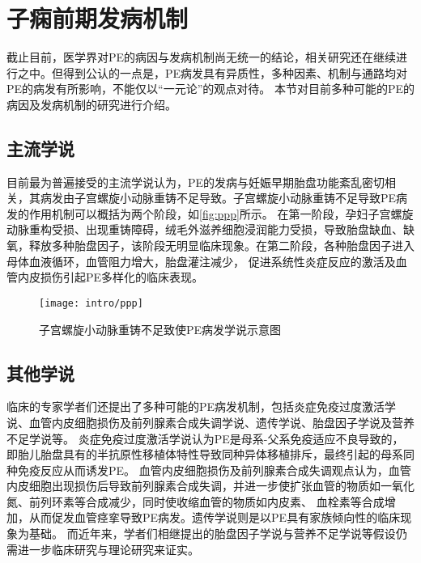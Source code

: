 \section{子痫前期发病机制}
截止目前，医学界对PE的病因与发病机制尚无统一的结论，相关研究还在继续进行之中。但得到公认的一点是，PE病发具有异质性，多种因素、机制与通路均对PE的病发有所影响，不能仅以“一元论”的观点对待。
本节对目前多种可能的PE的病因及发病机制的研究进行介绍。

\subsection{主流学说}
目前最为普遍接受的主流学说认为，PE的发病与妊娠早期胎盘功能紊乱密切相关，其病发由子宫螺旋小动脉重铸不足导致\cite{OAG9,Duvekot2010,2009ix}。子宫螺旋小动脉重铸不足导致PE病发的作用机制可以概括为两个阶段，如\autoref{fig:ppp}所示。
在第一阶段，孕妇子宫螺旋动脉重构受损、出现重铸障碍，绒毛外滋养细胞浸润能力受损，导致胎盘缺血、缺氧，释放多种胎盘因子，该阶段无明显临床现象。在第二阶段，各种胎盘因子进入母体血液循环，血管阻力增大，胎盘灌注减少，
促进系统性炎症反应的激活及血管内皮损伤引起PE多样化的临床表现。
\begin{figure}[htbp]
    \centering
    \texttt{[image: intro/ppp]}
    \caption[子宫螺旋小动脉重铸不足致使PE病发学说示意图]{\label{fig:ppp}子宫螺旋小动脉重铸不足致使PE病发学说示意图\cite{Duvekot2010,2009ix}}
\end{figure}

\subsection{其他学说}
临床的专家学者们还提出了多种可能的PE病发机制，包括炎症免疫过度激活学说、血管内皮细胞损伤及前列腺素合成失调学说、遗传学说、胎盘因子学说及营养不足学说等。
炎症免疫过度激活学说认为PE是母系-父系免疫适应不良导致的，即胎儿胎盘具有的半抗原性移植体特性导致同种异体移植排斥，最终引起的母系同种免疫反应从而诱发PE\cite{Sibai2005,OAG9,Shi2006,Moffett2002}。
血管内皮细胞损伤及前列腺素合成失调观点认为，血管内皮细胞出现损伤后导致前列腺素合成失调，并进一步使扩张血管的物质如一氧化氮、前列环素等合成减少，同时使收缩血管的物质如内皮素、
血栓素等合成增加，从而促发血管痉挛导致PE病发\cite{OAG9,Sibai2005}。遗传学说则是以PE具有家族倾向性的临床现象为基础\cite{OAG9,Sibai2005,Ge2013}。
而近年来，学者们相继提出的胎盘因子学说\cite{Shi2006}与营养不足学说\cite{OAG9}等假设仍需进一步临床研究与理论研究来证实。
\raggedbottom


